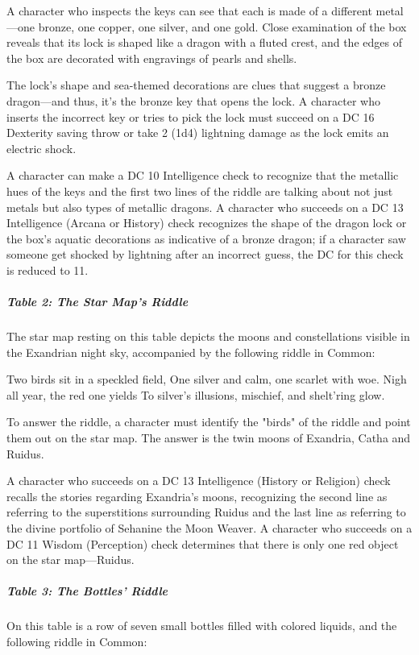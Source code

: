 \documentclass[10pt,a4paper,twoside,fancy,bg=print,twocolumn,openany,nodeprecatedcode]{dndbook}
\begin{document}
A character who inspects the keys can see that each is made of a different metal—one bronze, one copper, one silver, and one gold. Close examination of the box reveals that its lock is shaped like a dragon with a fluted crest, and the edges of the box are decorated with engravings of pearls and shells.

The lock's shape and sea-themed decorations are clues that suggest a bronze dragon—and thus, it's the bronze key that opens the lock. A character who inserts the incorrect key or tries to pick the lock must succeed on a DC 16 Dexterity saving throw or take 2 (1d4) lightning damage as the lock emits an electric shock.

A character can make a DC 10 Intelligence check to recognize that the metallic hues of the keys and the first two lines of the riddle are talking about not just metals but also types of metallic dragons. A character who succeeds on a DC 13 Intelligence (Arcana or History) check recognizes the shape of the dragon lock or the box's aquatic decorations as indicative of a bronze dragon; if a character saw someone get shocked by lightning after an incorrect guess, the DC for this check is reduced to 11.

\subparagraph{Table 2: The Star Map's Riddle}
The star map resting on this table depicts the moons and constellations visible in the Exandrian night sky, accompanied by the following riddle in Common:

\begin{DndReadAloud}{}
Two birds sit in a speckled field, One silver and calm, one scarlet with woe. Nigh all year, the red one yields To silver's illusions, mischief, and shelt'ring glow.

\end{DndReadAloud}

To answer the riddle, a character must identify the "birds" of the riddle and point them out on the star map. The answer is the twin moons of Exandria, Catha and Ruidus.

A character who succeeds on a DC 13 Intelligence (History or Religion) check recalls the stories regarding Exandria's moons, recognizing the second line as referring to the superstitions surrounding Ruidus and the last line as referring to the divine portfolio of Sehanine the Moon Weaver. A character who succeeds on a DC 11 Wisdom (Perception) check determines that there is only one red object on the star map—Ruidus.

\subparagraph{Table 3: The Bottles' Riddle}
On this table is a row of seven small bottles filled with colored liquids, and the following riddle in Common:
\end{document}
